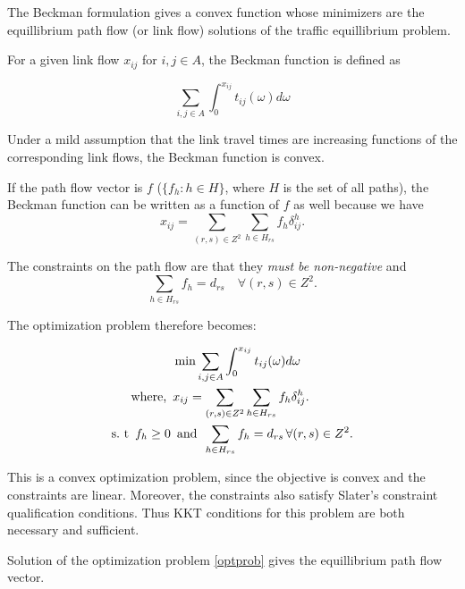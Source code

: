 The Beckman formulation gives a convex function whose minimizers
are the equillibrium path flow (or link flow) solutions
of the traffic equillibrium problem.

For a given link flow $x_{ij}$ for $i,j\in A$, the Beckman function
is defined as

\begin{equation}\label{beck}
	\sum_{i,j\in A}\int_{0}^{x_{ij}}t_{ij}(\omega)d\omega
\end{equation}

Under a mild assumption that the link travel times 
are increasing functions of the corresponding link flows,
the Beckman function is convex. %

If the path flow vector is $f$ ($\{f_h: h\in H\}$, where $H$ is the
set of all paths), the Beckman function can be written as a function
of $f$ as well because we have
\begin{equation}\label{linktopath}
	x_{ij} = \sum_{(r,s)\in Z^2}\sum_{h\in H_{rs}} f_h \delta_{ij}^h.
\end{equation}

The constraints on the path flow are that they
\emph{must be non-negative} and
\begin{equation}\label{pathconstr}
	\sum_{h\in H_{rs}} f_h = d_{rs} \quad \forall (r,s)\in Z^2.
\end{equation}


The optimization problem therefore becomes:

\begin{equation}\label{optprob}
\begin{split}
	&\min \sum_{i,j\in A}\int_{0}^{x_{ij}}t_{ij}(\omega)d\omega\hfill\\
	\text{where, } \, &x_{ij} =
	\sum_{(r,s)\in Z^2}\sum_{h\in H_{rs}} f_h \delta_{ij}^h.\\
	\text{s.\ t }\, f_h\geq 0\,&\text{ and }\,
	\sum_{h\in H_{rs}}f_h = d_{rs}\,\forall (r,s)\in Z^2.
\end{split}
\end{equation}

This is a convex optimization problem, since the objective is
convex and the constraints are linear. Moreover, the constraints
also satisfy Slater's constraint qualification conditions.
Thus KKT conditions for this problem are both necessary and
sufficient.

\begin{theorem}
	Solution of the optimization problem \eqref{optprob} gives
	the equillibrium path flow vector.
\end{theorem}

